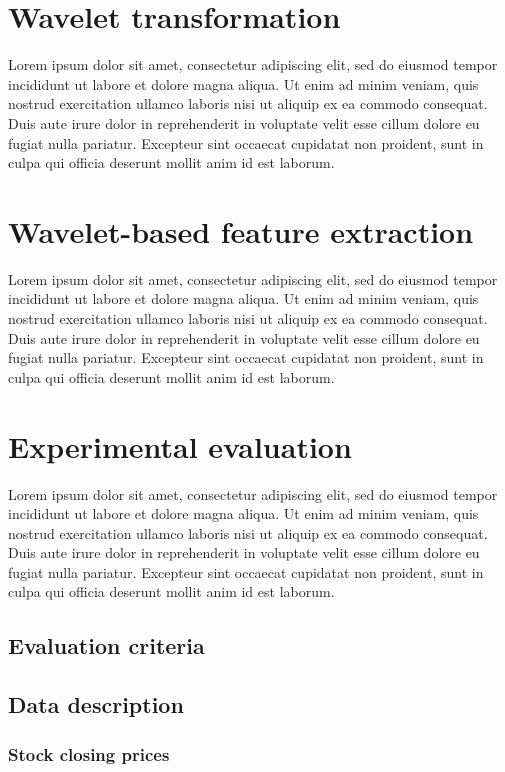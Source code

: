 \documentclass{article}
\begin{document}
\section{Wavelet transformation}
Lorem ipsum dolor sit amet, consectetur adipiscing elit, sed do eiusmod tempor incididunt ut labore et dolore magna aliqua. Ut enim ad minim veniam, quis nostrud exercitation ullamco laboris nisi ut aliquip ex ea commodo consequat. Duis aute irure dolor in reprehenderit in voluptate velit esse cillum dolore eu fugiat nulla pariatur. Excepteur sint occaecat cupidatat non proident, sunt in culpa qui officia deserunt mollit anim id est laborum.


\section{Wavelet-based feature extraction}
Lorem ipsum dolor sit amet, consectetur adipiscing elit, sed do eiusmod tempor incididunt ut labore et dolore magna aliqua. Ut enim ad minim veniam, quis nostrud exercitation ullamco laboris nisi ut aliquip ex ea commodo consequat. Duis aute irure dolor in reprehenderit in voluptate velit esse cillum dolore eu fugiat nulla pariatur. Excepteur sint occaecat cupidatat non proident, sunt in culpa qui officia deserunt mollit anim id est laborum.


\section{Experimental evaluation}
Lorem ipsum dolor sit amet, consectetur adipiscing elit, sed do eiusmod tempor incididunt ut labore et dolore magna aliqua. Ut enim ad minim veniam, quis nostrud exercitation ullamco laboris nisi ut aliquip ex ea commodo consequat. Duis aute irure dolor in reprehenderit in voluptate velit esse cillum dolore eu fugiat nulla pariatur. Excepteur sint occaecat cupidatat non proident, sunt in culpa qui officia deserunt mollit anim id est laborum.

\subsection{Evaluation criteria}

\subsection{Data description}

\subsubsection{Stock closing prices}
\end{document}
